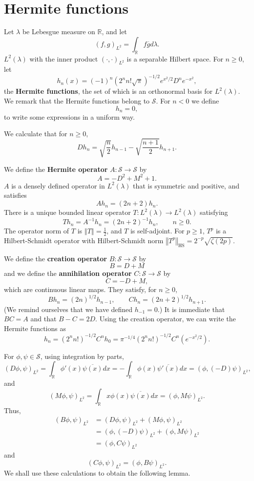 \documentclass{article}
\newcommand{\norm}[1]{\left\Vert #1 \right\Vert}
\newcommand{\HS}[1]{\left\Vert #1 \right\Vert_{\mathrm{HS}}}
\theoremstyle{definition}
\theoremstyle{definition}
\begin{document}
 


\section{Hermite functions}
Let $\lambda$ be Lebesgue measure on $\mathbb{R}$,
and let 
\[
(f,g)_{L^2} = \int_{\mathbb{R}} f \overline{g} d\lambda.
\]
$L^2(\lambda)$ with the inner product $(\cdot,\cdot)_{L^2}$ is a separable Hilbert space. 
For $n \geq 0$, let
\[
h_n(x) = (-1)^n(2^n n! \sqrt{\pi})^{-1/2} e^{x^2/2} D^n e^{-x^2},
\]
the \textbf{Hermite functions}, the set of which is an orthonormal basis for $L^2(\lambda)$.
We remark that the Hermite functions belong to $\mathscr{S}$.
For $n<0$ we define
\[
h_n=0,
\]
to write some expressions in a uniform way.

We calculate that for $n \geq 0$,
\[
Dh_n = \sqrt{\frac{n}{2}} h_{n-1}-\sqrt{\frac{n+1}{2}} h_{n+1}.
\]


We define the \textbf{Hermite operator} $A:\mathscr{S} \to \mathscr{S}$ by
\[
A=-D^2+M^2+1.
\]
$A$ is a densely defined operator in $L^2(\lambda)$ that is symmetric and positive, and  satisfies
\[
Ah_n = (2n+2)h_n.
\]
There is a unique bounded linear operator $T:L^2(\lambda) \to L^2(\lambda)$ satisfying
\[
Th_n=A^{-1}h_n = (2n+2)^{-1} h_n,\qquad n \geq 0.
\]
The operator norm of $T$ is $\norm{T}=\frac{1}{2}$, and $T$ is self-adjoint. For $p \geq 1$, 
$T^p$ is a Hilbert-Schmidt operator with Hilbert-Schmidt norm $\HS{T^p}=2^{-p} \sqrt{\zeta(2p)}$. 

We define the \textbf{creation operator} $B:\mathscr{S} \to \mathscr{S}$ by
\[
B=D+M
\]
and we define the \textbf{annihilation operator} $C:\mathscr{S} \to \mathscr{S}$ by
\[
C=-D+M,
\]
which are continuous linear maps. They satisfy, for $n \geq 0$,
\[
Bh_n = (2n)^{1/2}h_{n-1},\qquad Ch_n=(2n+2)^{1/2}h_{n+1}.
\]
(We remind ourselves that we have defined $h_{-1}=0$.)
It is immediate that $BC=A$ and that $B-C=2D$. 
Using the creation operator, we can write the Hermite functions as
\[
h_n=(2^n n!)^{-1/2} C^n h_0 = \pi^{-1/4} (2^n n!)^{-1/2} C^n(e^{-x^2/2}).
\]

For $\phi,\psi \in \mathscr{S}$, using integration by parts,
\[
(D\phi,\psi)_{L^2}=\int_{\mathbb{R}} \phi'(x) \overline{\psi(x)} dx
=-\int_{\mathbb{R}} \phi(x) \overline{\psi'(x)} dx
=(\phi,(-D)\psi)_{L^2},
\]
and 
\[
(M\phi,\psi)_{L^2}=\int_{\mathbb{R}} x \phi(x) \overline{\psi(x)} dx
=(\phi,M\psi)_{L^2}.
\]
Thus,
\begin{align*}
(B\phi,\psi)_{L^2}&=(D\phi,\psi)_{L^2} + (M\phi,\psi)_{L^2}\\
&=(\phi,(-D)\psi)_{L^2}+(\phi,M\psi)_{L^2}\\
&=(\phi,C\psi)_{L^2}
\end{align*}
and
\[
(C\phi,\psi)_{L^2}=(\phi,B\psi)_{L^2}.
\]
We shall use these calculations to obtain the following lemma.
\end{document}
